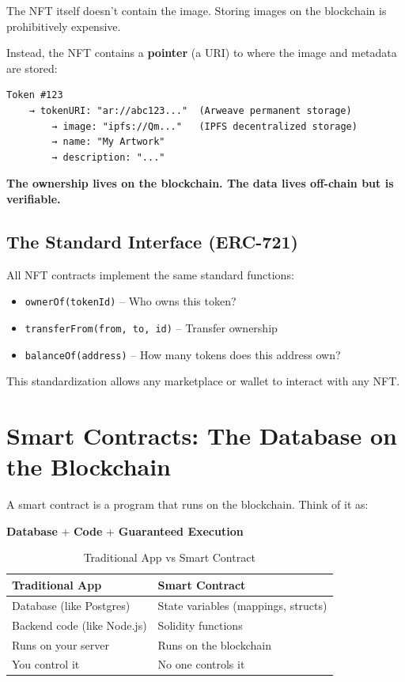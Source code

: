 \documentclass[11pt,a4paper]{article}
\newcommand{\code}[1]{\texttt{#1}}
\begin{document}
The NFT itself doesn't contain the image. Storing images on the blockchain is prohibitively expensive.

Instead, the NFT contains a \textbf{pointer} (a URI) to where the image and metadata are stored:

\begin{mdframed}[style=codeblock]
\begin{verbatim}
Token #123
    → tokenURI: "ar://abc123..."  (Arweave permanent storage)
        → image: "ipfs://Qm..."   (IPFS decentralized storage)
        → name: "My Artwork"
        → description: "..."
\end{verbatim}
\end{mdframed}

\textbf{The ownership lives on the blockchain. The data lives off-chain but is verifiable.}

\subsection{The Standard Interface (ERC-721)}

All NFT contracts implement the same standard functions:

\begin{itemize}
    \item \code{ownerOf(tokenId)} -- Who owns this token?
    \item \code{transferFrom(from, to, id)} -- Transfer ownership
    \item \code{balanceOf(address)} -- How many tokens does this address own?
\end{itemize}

This standardization allows any marketplace or wallet to interact with any NFT.

\newpage
\section{Smart Contracts: The Database on the Blockchain}

A smart contract is a program that runs on the blockchain. Think of it as:

\textbf{Database} + \textbf{Code} + \textbf{Guaranteed Execution}

\begin{table}[h]
\centering
\begin{tabular}{@{}L{6cm}L{6cm}@{}}
\toprule
\textbf{Traditional App} & \textbf{Smart Contract} \\
\midrule
Database (like Postgres) & State variables (mappings, structs) \\
Backend code (like Node.js) & Solidity functions \\
Runs on your server & Runs on the blockchain \\
You control it & No one controls it \\
\bottomrule
\end{tabular}
\caption{Traditional App vs Smart Contract}
\end{table}
\end{document}

